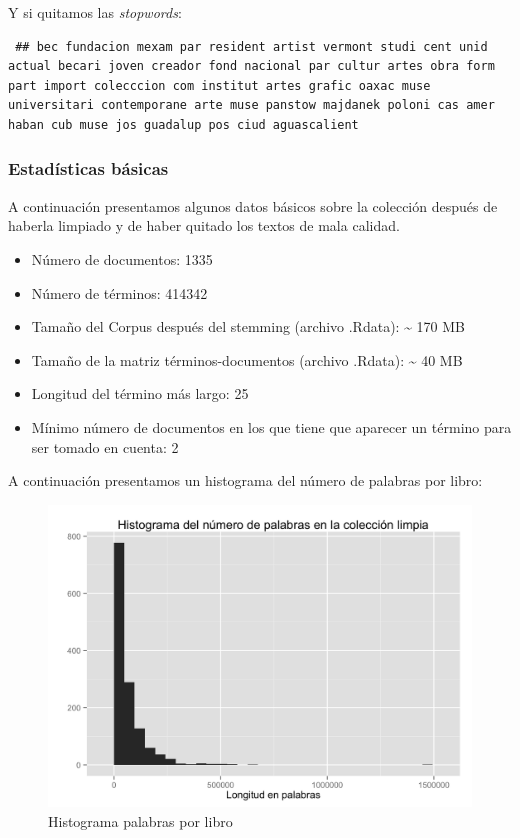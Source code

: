 Y si quitamos las \emph{stopwords}:

\begin{lstlisting}
 ## bec fundacion mexam par resident artist vermont studi cent unid actual becari joven creador fond nacional par cultur artes obra form part import colecccion com institut artes grafic oaxac muse universitari contemporane arte muse panstow majdanek poloni cas amer haban cub muse jos guadalup pos ciud aguascalient
\end{lstlisting}

\subsubsection{Estadísticas básicas}\label{estadisticas-basicas}

A continuación presentamos algunos datos básicos sobre la colección
después de haberla limpiado y de haber quitado los textos de mala
calidad.

\begin{itemize}
\itemsep1pt\parskip0pt
\item
  Número de documentos: 1335
\item
  Número de términos: 414342
\item
  Tamaño del Corpus después del stemming (archivo .Rdata):
  \textasciitilde{} 170 MB
\item
  Tamaño de la matriz términos-documentos (archivo .Rdata):
  \textasciitilde{} 40 MB
\item
  Longitud del término más largo: 25
\item
  Mínimo número de documentos en los que tiene que aparecer un término
  para ser tomado en cuenta: 2
\end{itemize}

A continuación presentamos un histograma del número de palabras por
libro:

\begin{figure}[H]
\centering
\includegraphics[width=1\textwidth]{Figures/L1.png}
\caption{Histograma palabras por libro}
\end{figure}

